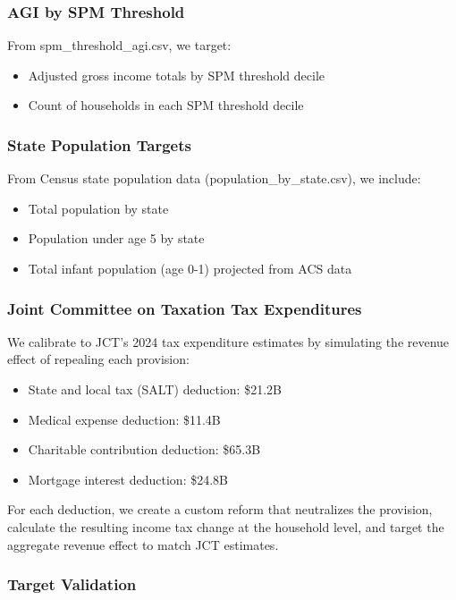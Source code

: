 \subsubsection{AGI by SPM Threshold}

From spm\_threshold\_agi.csv, we target:
\begin{itemize}
    \item Adjusted gross income totals by SPM threshold decile
    \item Count of households in each SPM threshold decile
\end{itemize}

\subsubsection{State Population Targets}

From Census state population data (population\_by\_state.csv), we include:
\begin{itemize}
    \item Total population by state
    \item Population under age 5 by state
    \item Total infant population (age 0-1) projected from ACS data
\end{itemize}

\subsubsection{Joint Committee on Taxation Tax Expenditures}

We calibrate to JCT's 2024 tax expenditure estimates by simulating the revenue effect of repealing each provision:
\begin{itemize}
    \item State and local tax (SALT) deduction: \$21.2B
    \item Medical expense deduction: \$11.4B  
    \item Charitable contribution deduction: \$65.3B
    \item Mortgage interest deduction: \$24.8B
\end{itemize}

For each deduction, we create a custom reform that neutralizes the provision, calculate the resulting income tax change at the household level, and target the aggregate revenue effect to match JCT estimates.

\subsubsection{Target Validation}

